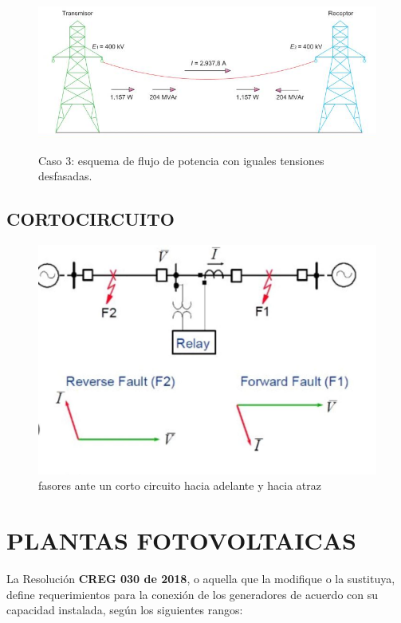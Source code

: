\documentclass[a5paper]{book}%
\begin{document}
\begin{figure}[H]
  \centering
  \caption{Caso 3: esquema de flujo de potencia con iguales tensiones
    desfasadas.}
  \includegraphics[width=\linewidth]{tensionesigualesdesfasadas}
  \label{fig:caso3}
\end{figure}

\section{CORTOCIRCUITO}

\begin{figure}[H]
  \centering
  \caption{fasores ante un corto circuito hacia adelante y hacia atraz}
  \label{fig:fasores}
  \includegraphics[width=\linewidth]{cortcircuito}
  \end{figure}

\chapter{PLANTAS FOTOVOLTAICAS}


La Resolución \textbf{CREG 030 de 2018}, o aquella que la modifique o la sustituya, define requerimientos para la conexión de los generadores de acuerdo con su capacidad instalada,
según los siguientes rangos:
\end{document}
